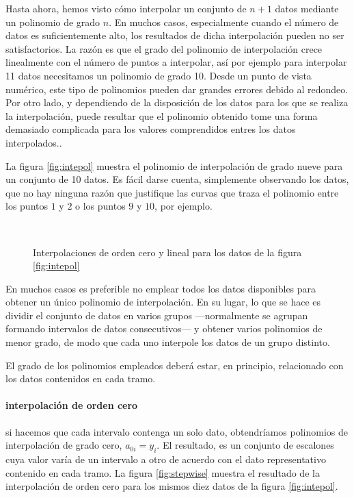 Hasta ahora, hemos visto cómo interpolar un conjunto de $n+1$ datos mediante un polinomio de grado $n$. En muchos casos, especialmente cuando el número de datos es suficientemente alto, los resultados de dicha interpolación pueden no ser satisfactorios.  La razón es que el grado del polinomio de interpolación crece linealmente con el número de puntos a interpolar, así por ejemplo para interpolar 11 datos necesitamos un polinomio de grado 10. Desde un punto de vista numérico, este tipo de polinomios pueden dar grandes errores debido al redondeo. Por otro lado, y dependiendo de la disposición de los datos para los que se realiza la interpolación, puede resultar que el polinomio obtenido tome una forma demasiado complicada para los valores comprendidos entres los datos interpolados..  

La figura \ref{fig:intepol} muestra el polinomio de interpolación de grado nueve para un conjunto de 10 datos. Es fácil darse cuenta, simplemente observando los datos, que no hay ninguna razón que justifique las curvas que traza el polinomio entre los puntos $1$ y $2$  o los puntos $9$ y $10$, por ejemplo.

\begin{figure}
\centering
{} %
{}\\
\caption{Interpolaciones de orden cero y lineal para los datos de la figura \ref{fig:intepol} }
\end{figure}


En muchos casos es preferible no emplear todos los datos disponibles para obtener un único polinomio de interpolación. En su lugar, lo que se hace es dividir el conjunto de datos en varios grupos ---normalmente se agrupan formando intervalos de datos consecutivos--- y obtener varios polinomios de menor grado, de modo que cada uno interpole los datos de un grupo distinto. 

El grado de los polinomios empleados deberá estar, en principio, relacionado con los datos contenidos en cada tramo.


\paragraph{interpolación de orden cero}  si hacemos que cada intervalo contenga un solo dato, obtendríamos polinomios de interpolación de grado cero, $a_{0i}=y_i$. El resultado, es un conjunto de escalones cuya valor varía de un intervalo a otro de acuerdo con el dato representativo contenido en cada tramo. La figura \ref{fig:stepwise} muestra el resultado de la interpolación de orden cero para los mismos diez datos de la figura \ref{fig:intepol}.

